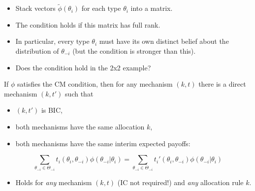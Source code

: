 \documentclass[english,handout]{beamer}		%
\def\lyxframeend{} %
\begin{document}
\begin{itemize}
	\item Stack vectors $\tilde\phi(\theta_i)$ for each type $\theta_i$ into a matrix.
	\item The condition holds if this matrix has full rank.
	\item In particular, every type $\theta_i$ must have its own distinct belief about the distribution of $\theta_{-i}$ (but the condition is stronger than this).
	\item Does the condition hold in the 2x2 example?
\end{itemize}
\lyxframeend


\begin{theorem}
	If $\phi$ satisfies the CM condition, then for any mechanism $(k,t)$ there is a direct mechanism $(k,t')$ such that
	\begin{itemize}
		\item $(k,t')$ is BIC,
		\item both mechanisms have the same allocation $k$,
		\item both mechanisms have the same interim expected payoffs:
	\end{itemize}
	\begin{equation*}
	\sum_{\theta _{-i}\in\Theta _{-i}}t_i(\theta _i,\theta _{-i})\phi(\theta _{-i}|\theta _i)=  \sum_{\theta _{-i}\in\Theta _{-i}}t_i'(\theta _i,\theta _{-i})\phi(\theta _{-i}|\theta _i)
	\end{equation*}
\end{theorem}
\begin{itemize}
	\item Holds for \emph{any} mechanism $(k,t)$ (IC not required!) and \emph{any} allocation rule $k$.
\end{itemize}
\vspace{-2ex}
\lyxframeend
\end{document}
